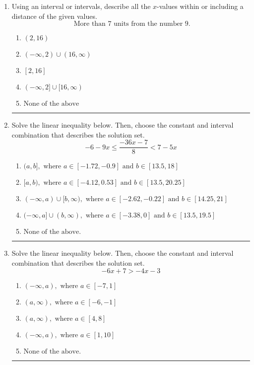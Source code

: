 \documentclass[14pt]{extbook}
\newcommand{\litem}[1]{\item#1\hspace*{-1cm}\rule{\textwidth}{0.4pt}}
\begin{document}
\begin{enumerate}
{\begin{enumerate}[label=\Alph*.]
\end{enumerate} }
\litem{
Using an interval or intervals, describe all the $x$-values within or including a distance of the given values.\[ \text{ More than } 7 \text{ units from the number } 9. \]\begin{enumerate}[label=\Alph*.]
\item \( (2, 16) \)
\item \( (-\infty, 2) \cup (16, \infty) \)
\item \( [2, 16] \)
\item \( (-\infty, 2] \cup [16, \infty) \)
\item \( \text{None of the above} \)

\end{enumerate} }
\litem{
Solve the linear inequality below. Then, choose the constant and interval combination that describes the solution set.\[ -6 - 9 x \leq \frac{-36 x - 7}{8} < 7 - 5 x \]\begin{enumerate}[label=\Alph*.]
\item \( (a, b], \text{ where } a \in [-1.72, -0.9] \text{ and } b \in [13.5, 18] \)
\item \( [a, b), \text{ where } a \in [-4.12, 0.53] \text{ and } b \in [13.5, 20.25] \)
\item \( (-\infty, a) \cup [b, \infty), \text{ where } a \in [-2.62, -0.22] \text{ and } b \in [14.25, 21] \)
\item \( (-\infty, a] \cup (b, \infty), \text{ where } a \in [-3.38, 0] \text{ and } b \in [13.5, 19.5] \)
\item \( \text{None of the above.} \)

\end{enumerate} }
\litem{
Solve the linear inequality below. Then, choose the constant and interval combination that describes the solution set.\[ -6x + 7 > -4x -3 \]\begin{enumerate}[label=\Alph*.]
\item \( (-\infty, a), \text{ where } a \in [-7, 1] \)
\item \( (a, \infty), \text{ where } a \in [-6, -1] \)
\item \( (a, \infty), \text{ where } a \in [4, 8] \)
\item \( (-\infty, a), \text{ where } a \in [1, 10] \)
\item \( \text{None of the above}. \)


\end{enumerate}}
\end{enumerate}
\end{document}
